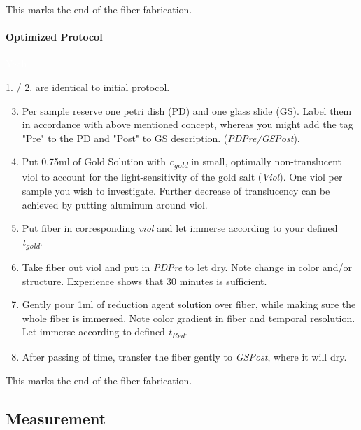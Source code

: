     \begin{center}
        This marks the end of the fiber fabrication.
    \end{center}


\paragraph{Optimized Protocol}\textcolor{white}{Yeah}\nextline

1. / 2. are identical to initial protocol.

\begin{enumerate}
\setcounter{enumi}{2}
    
    \item Per sample reserve one petri dish (PD) and one glass slide (GS). Label them in accordance with above mentioned concept, whereas you might add the tag "Pre" to the PD and "Post" to GS description. (\textit{PDPre/GSPost}).
    
    \item Put 0.75ml of Gold Solution with \textit{c\textsubscript{gold}} in small, optimally non-translucent viol to account for the light-sensitivity of the gold salt (\textit{Viol}). One viol per sample you wish to investigate. Further decrease of translucency can be achieved by putting aluminum around viol.
    
    \item Put fiber in corresponding \textit{viol} and let immerse according to your defined \textit{t\textsubscript{gold}}.
    \item Take fiber out viol and put in \textit{PDPre} to let dry. Note change in color and/or structure. Experience shows that 30 minutes is sufficient.
    
    \item Gently pour 1ml of reduction agent solution over fiber, while making sure the whole fiber is immersed. Note color gradient in fiber and temporal resolution. Let immerse according to defined \textit{t\textsubscript{Red}}.
    
    \item After passing of time, transfer the fiber gently to \textit{GSPost}, where it will dry.
    \end{enumerate}
    
    \begin{center}
        This marks the end of the fiber fabrication.
    \end{center}


\subsection{Measurement}
